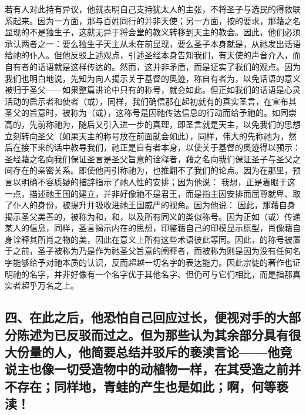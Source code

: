 若有人对此持有异议，他就表明自己支持犹太人的主张，不将圣子与选民的得救联系起来。因为一方面，那与百姓同行的并非天使；另一方面，按的要求，那藉之名显现的不是独生子，这就无异于将会堂的教义转移到天主的教会。因此，他们必须承认两者之一：要么独生子天主从未在前显现，要么圣子本身就是，从祂发出话语给祂的仆人。但他反驳上述观点，引述圣经本身告知我们，有天使的声音介入，而自有者的话语就是这样传达的。然而，这并非矛盾，而是证实了我们的观点。因为我们也明白地说，先知为向人揭示关于基督的奥迹，称自有者为，以免话语的意义被归于圣父——如果整篇讲论中只有的称号，就会如此。但正如我们的话语是心灵活动的启示者和使者（或），同样，我们确信那在起初就有的真实圣言，在宣布其圣父的旨意时，被称为（或），这称号是因祂传达信息的行动而给予祂的。如同崇高的，先前称祂为，随后又引入进一步的真理，即圣言就是天主，以免我们的思想立刻转向圣父（如果天主的称号放在前面就会如此），同样，伟大的先称祂为，然后在接下来的话中教导我们，祂正是自有者本身，以使关于基督的奥迹得以预示：圣经藉之名向我们保证圣言是圣父旨意的诠释者，藉之名向我们保证圣子与圣父之间存在的亲密关系。即使他再引称祂为，也推翻不了我们的论点。因为在那里，预言以明确不容质疑的措辞指示了祂人性的安排；因为他说： 我想，正是着眼于这一点，描述祂王国的建立，并非好像祂不是君王，而是指主因安排而屈尊就卑、取了仆人的身份，被提升并吸收进祂王国威严的视角。因为他说： 因此，那藉自身揭示圣父美善的，被称为和，和，以及所有同义的类似称号。因为正如（或）传递某人的信息，同样，圣言揭示内在的思想，印鉴藉自己的印模显示原型，肖像藉自身诠释其所肖之物的美，因此在意义上所有这些术语彼此等同。因此，的称号被置于之前，圣子被称为乃是作为祂圣父旨意的阐释者，而被称为则是因为没有任何名字能够给予对祂本质的认识，反而超越一切名字的表达能力。因此宗徒的著作也证明祂的名字，并非好像有一个名字优于其他名字、但仍可与它们相比，而是指那真实者超乎万名之上。\par


\subsection{四、在此之后，他恐怕自己回应过长，便视对手的大部分陈述为已反驳而过之。但为那些认为其余部分具有很大份量的人，他简要总结并驳斥的亵渎言论——他竟说主也像一切受造物中的动植物一样，在其受造之前并不存在；同样地，青蛙的产生也是如此；啊，何等亵渎！}

